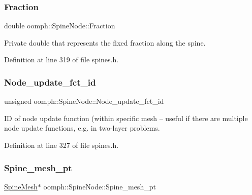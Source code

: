 \subsubsection{\texorpdfstring{Fraction}{Fraction}}
{\footnotesize\ttfamily double oomph\+::\+Spine\+Node\+::\+Fraction\hspace{0.3cm}{\ttfamily [private]}}



Private double that represents the fixed fraction along the spine. 



Definition at line 319 of file spines.\+h.

\mbox{\label{classoomph_1_1SpineNode_ac68d55d54018e5d908c5f81ab4b053a7}} 
\subsubsection{\texorpdfstring{Node\+\_\+update\+\_\+fct\+\_\+id}{Node\_update\_fct\_id}}
{\footnotesize\ttfamily unsigned oomph\+::\+Spine\+Node\+::\+Node\+\_\+update\+\_\+fct\+\_\+id\hspace{0.3cm}{\ttfamily [private]}}

ID of node update function (within specific mesh -- useful if there are multiple node update functions, e.\+g. in two-\/layer problems. 

Definition at line 327 of file spines.\+h.

\mbox{\label{classoomph_1_1SpineNode_a8154a0fe0c361b730edc27e8e85c077a}} 
\subsubsection{\texorpdfstring{Spine\+\_\+mesh\+\_\+pt}{Spine\_mesh\_pt}}
{\footnotesize\ttfamily \hyperlink{classoomph_1_1SpineMesh}{Spine\+Mesh}$\ast$ oomph\+::\+Spine\+Node\+::\+Spine\+\_\+mesh\+\_\+pt\hspace{0.3cm}{\ttfamily [private]}}



